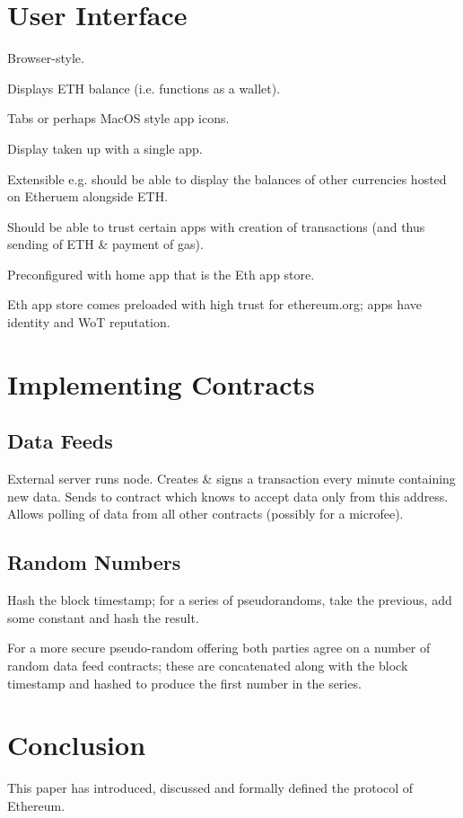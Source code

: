 \documentclass[9pt,oneside]{amsart}
\makeatletter
\newcommand*\eg{e.g.\@\xspace}
\makeatother
\begin{document}
\begin{multicols}{2}
\section{User Interface}

Browser-style.

Displays ETH balance (i.e. functions as a wallet).

Tabs or perhaps MacOS style app icons.

Display taken up with a single app.

Extensible \eg should be able to display the balances of other currencies hosted on Etheruem alongside ETH.

Should be able to trust certain apps with creation of transactions (and thus sending of ETH \& payment of gas).

Preconfigured with home app that is the Eth app store.

Eth app store comes preloaded with high trust for ethereum.org; apps have identity and WoT reputation.

\section{Implementing Contracts}

\subsection{Data Feeds}

External server runs node. Creates \& signs a transaction every minute containing new data. Sends to contract which knows to accept data only from this address. Allows polling of data from all other contracts (possibly for a microfee).

\subsection{Random Numbers}

Hash the block timestamp; for a series of pseudorandoms, take the previous, add some constant and hash the result.

For a more secure pseudo-random offering both parties agree on a number of random data feed contracts; these are concatenated along with the block timestamp and hashed to produce the first number in the series.

\section{Conclusion} \label{ch:conclusion}

This paper has introduced, discussed and formally defined the protocol of Ethereum.




\end{multicols}
\end{document}
